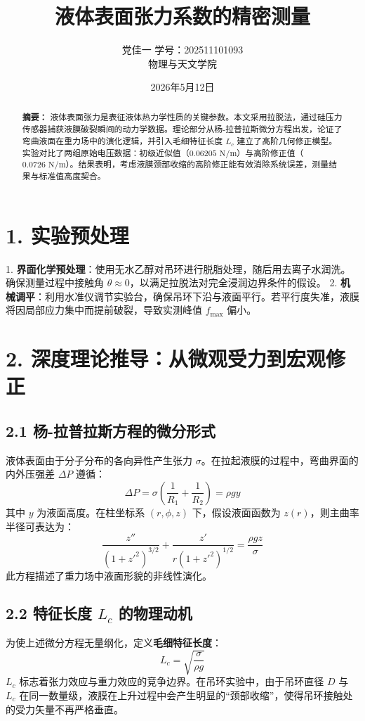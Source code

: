 \documentclass[twocolumn, 10pt, UTF8]{ctexart}
\title{\textbf{\huge 液体表面张力系数的精密测量}}
\author{党佳一 \quad 学号：202511101093 \\ 物理与天文学院}
\date{2026年5月12日}
\begin{document}
	
	\maketitle
	
	\begin{abstract}
		\textbf{摘要：} 液体表面张力是表征液体热力学性质的关键参数。本文采用拉脱法，通过硅压力传感器捕获液膜破裂瞬间的动力学数据。理论部分从杨-拉普拉斯微分方程出发，论证了弯曲液面在重力场中的演化逻辑，并引入毛细特征长度 $L_c$ 建立了高阶几何修正模型。实验对比了两组原始电压数据：初级近似值（$0.06205\text{ N/m}$）与高阶修正值（$0.0726\text{ N/m}$）。结果表明，考虑液膜颈部收缩的高阶修正能有效消除系统误差，测量结果与标准值高度契合。
	\end{abstract}
	
	\section{1. 实验预处理}
	1. \textbf{界面化学预处理}：使用无水乙醇对吊环进行脱脂处理，随后用去离子水润洗。确保测量过程中接触角 $\theta \approx 0$，以满足拉脱法对完全浸润边界条件的假设。
	2. \textbf{机械调平}：利用水准仪调节实验台，确保吊环下沿与液面平行。若平行度失准，液膜将因局部应力集中而提前破裂，导致实测峰值 $f_{\max}$ 偏小。
	
	\section{2. 深度理论推导：从微观受力到宏观修正}
	
	\subsection{2.1 杨-拉普拉斯方程的微分形式}
	液体表面由于分子分布的各向异性产生张力 $\sigma$。在拉起液膜的过程中，弯曲界面的内外压强差 $\Delta P$ 遵循：
	\begin{equation}
		\Delta P = \sigma \left( \frac{1}{R_1} + \frac{1}{R_2} \right) = \rho g y
	\end{equation}
	其中 $y$ 为液面高度。在柱坐标系 $(r, \phi, z)$ 下，假设液面函数为 $z(r)$，则主曲率半径可表达为：
	\begin{equation}
		\frac{z''}{(1+z'^2)^{3/2}} + \frac{z'}{r(1+z'^2)^{1/2}} = \frac{\rho g z}{\sigma}
	\end{equation}
	此方程描述了重力场中液面形貌的非线性演化。
	
	\subsection{2.2 特征长度 $L_c$ 的物理动机}
	为使上述微分方程无量纲化，定义\textbf{毛细特征长度}：
	\begin{equation}
		L_c = \sqrt{\frac{\sigma}{\rho g}}
	\end{equation}
	$L_c$ 标志着张力效应与重力效应的竞争边界。在吊环实验中，由于吊环直径 $D$ 与 $L_c$ 在同一数量级，液膜在上升过程中会产生明显的“颈部收缩”，使得吊环接触处的受力矢量不再严格垂直。
	
\end{document}
